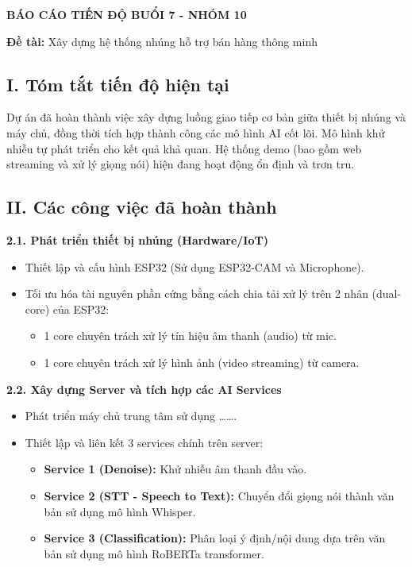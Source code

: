 \documentclass[
  13pt,
]{article}
\author{}
\date{}
\begin{document}
\textbf{BÁO CÁO TIẾN ĐỘ BUỔI 7 - NHÓM 10}

\textbf{Đề tài:} Xây dựng hệ thống nhúng hỗ trợ bán hàng thông minh

\subsection{\texorpdfstring{\textbf{I. Tóm tắt tiến độ hiện
tại}}{I. Tóm tắt tiến độ hiện tại}}\label{i.-tuxf3m-tux1eaft-tiux1ebfn-ux111ux1ed9-hiux1ec7n-tux1ea1i}

Dự án đã hoàn thành việc xây dựng luồng giao tiếp cơ bản giữa thiết bị
nhúng và máy chủ, đồng thời tích hợp thành công các mô hình AI cốt lõi.
Mô hình khử nhiễu tự phát triển cho kết quả khả quan. Hệ thống demo (bao
gồm web streaming và xử lý giọng nói) hiện đang hoạt động ổn định và
trơn tru.

\subsection{\texorpdfstring{\textbf{II. Các công việc đã hoàn
thành}}{II. Các công việc đã hoàn thành}}\label{ii.-cuxe1c-cuxf4ng-viux1ec7c-ux111uxe3-houxe0n-thuxe0nh}

\textbf{2.1. Phát triển thiết bị nhúng (Hardware/IoT)}

\begin{itemize}
\item
  Thiết lập và cấu hình ESP32 (Sử dụng ESP32-CAM và Microphone).
\item
  Tối ưu hóa tài nguyên phần cứng bằng cách chia tải xử lý trên 2 nhân
  (dual-core) của ESP32:

  \begin{itemize}
  \item
    1 core chuyên trách xử lý tín hiệu âm thanh (audio) từ mic.
  \item
    1 core chuyên trách xử lý hình ảnh (video streaming) từ camera.
  \end{itemize}
\end{itemize}

\textbf{2.2. Xây dựng Server và tích hợp các AI Services}

\begin{itemize}
\item
  Phát triển máy chủ trung tâm sử dụng \ldots\ldots.
\item
  Thiết lập và liên kết 3 services chính trên server:

  \begin{itemize}
  \item
    \textbf{Service 1 (Denoise):} Khử nhiễu âm thanh đầu vào.
  \item
    \textbf{Service 2 (STT - Speech to Text):} Chuyển đổi giọng nói
    thành văn bản sử dụng mô hình Whisper.
  \item
    \textbf{Service 3 (Classification):} Phân loại ý định/nội dung dựa
    trên văn bản sử dụng mô hình RoBERTa transformer.
  \end{itemize}
\end{itemize}
\end{document}
